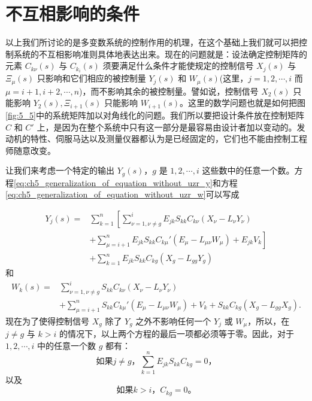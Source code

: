 \section{不互相影响的条件}

以上我们所讨论的是多变数系统的控制作用的机理，在这个基础上我们就可以把控制系统的不互相影响准则具体地表达出来。现在的问题就是：设法确定控制矩阵的元素 $C_{k\nu}(s)$ 与 $C_{k_i}(s)$ 须要满足什么条件才能使规定的控制信号 $X_j(s)$ 与 $\Xi_{\mu}(s)$ 只影响和它们相应的被控制量 $Y_j(s)$ 和 $W_{\mu}(s)$(这里，$j=1,2,\cdots,i$ 而 $\mu=i+1,i+2,\cdots,n$)，而不影响其余的被控制量。譬如说，控制信号 $X_2(s)$ 只能影响 $Y_2(s),\Xi_{i+1}(s)$ 只能影响 $W_{i+1}(s)$。这里的数学问题也就是如何把图\ref{fig:5_5}中的系统矩阵加以对角线化的问题。我们所以要把设计条件放在控制矩阵 $C$ 和 $C'$ 上，是因为在整个系统中只有这一部分是最容易由设计者加以变动的。发动机的特性、伺服马达以及测量仪器都认为是已经固定的，它们也不能由控制工程师随意改变。

让我们来考虑一个特定的输出 $Y_g(s)$，$g$ 是 $1,2,\cdots,i$ 这些数中的任意一个数。方程\eqref{eq:ch5_generalization_of_equation_without_uzr_y}和方程\eqref{eq:ch5_generalization_of_equation_without_uzr_w}可以写成

\begin{equation*}
\begin{array}{ll}
Y_j(s) = &\sum_{k=1}^n \left[ \sum_{\nu=1,\nu\neq g}^{i} E_{jk} S_{kk} C_{k\nu}(X_\nu - L_\nu Y_\nu)\right.\\
		 & \left. + \sum_{\mu=i+1}^n E_{jk} S_{kk} C_{k\mu}' (E_\mu - L_{\mu\nu} W_\mu) + E_{jk} V_k \right]\\
		 & + \sum_{k=1}^n E_{jk} S_{kk} C_{kg} (X_g - L_{gg} Y_g)
\end{array}
\end{equation*}
和
\begin{equation*}
\begin{array}{ll}
W_k(s) = &\sum_{\nu=1,\nu\neq g}^{i} S_{kk} C_{k\nu}(X_\nu - L_\nu Y_\nu)\\
		 & + \sum_{\mu=i+1}^n S_{kk} C_{k\mu}' (E_\mu - L_{\mu\nu} W_\mu) + V_k + S_{kk} C_{kg} (X_g - L_{gg} X_g).
\end{array}
\end{equation*}
现在为了使得控制信号 $X_g$ 除了 $Y_g$ 之外不影响任何一个 $Y_j$ 或 $W_\mu$，所以，在 $j\neq g$ 与 $k>i$ 的情况下，以上两个方程的最后一项都必须等于零。因此，对于 $1,2,\cdots,i$ 中的任意一个数 $g$ 都有：
\begin{equation}\label{eq:ch5_restriction_condition}
\mbox{如果} j \neq g，\sum_{k=1}^n E_{jk} S_{kk} C_{kg} = 0，
\end{equation}
以及
\begin{equation}\label{eq:ch5_condition_k_ckg}
\mbox{如果} k > i，C_{kg} = 0。
\end{equation}

